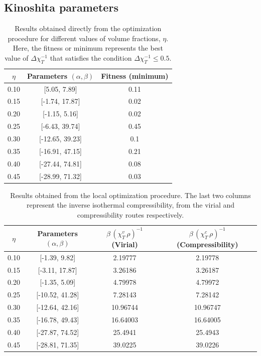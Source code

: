 \subsection{Kinoshita parameters}
\begin{table}
    \centering
    \begin{tabular}{|c|c|c|}
    \hline
    \(\eta\)  & Parameters \(\left(\alpha, \beta\right)\)  & Fitness (minimum)    \\ \hline
    0.10 & {[}5.05, 7.89{]}    & 0.11          \\ \hline
    0.15 & {[}-1.74, 17.87{]}   & 0.02          \\ \hline
    0.20 & {[}-1.15, 5.16{]}    & 0.02   \\ \hline
    0.25 & {[}-6.43, 39.74{]}   & 0.45  \\ \hline
    0.30 & {[}-12.65, 39.23{]} & 0.1  \\ \hline
    0.35 & {[}-16.91, 47.15{]}    & 0.21  \\ \hline
    0.40 & {[}-27.44, 74.81{]}  & 0.08  \\ \hline
    0.45 & {[}-28.99, 71.32{]}  & 0.03 \\ \hline
    \end{tabular}%
    \caption{Results obtained directly from the optimization procedure for different values of volume fractions, \(\eta\). Here, the fitness or minimum represents the best value of \(\Delta \chi^{-1}_{T}\) that satisfies the condition \(\Delta \chi^{-1}_{T} \leq 0.5\).}
    \label{tab:global-opt}
\end{table}

\begin{table}
    \centering
    \begin{tabular}{|c|c|c|c|}
    \hline
    \(\eta\)  & Parameters \(\left(\alpha, \beta\right)\) & \(\beta \, {\left(\chi^{v}_{T} \, \rho\right)}^{-1}\) (Virial)  & \(\beta \, {\left(\chi^{c}_{T} \, \rho\right)}^{-1}\) (Compressibility)  \\ \hline
    0.10 & [-1.39, 9.82]   & 2.19777  & 2.19778 \\ \hline
    0.15 & [-3.11, 17.87]  & 3.26186 & 3.26187  \\ \hline
    0.20 & [-1.35, 5.09]   & 4.79978  & 4.79972  \\ \hline
    0.25 & [-10.52, 41.28] & 7.28143  & 7.28142 \\ \hline
    0.30 & [-12.64, 42.16] & 10.96744 & 10.96747 \\ \hline
    0.35 & [-16.78, 49.43] & 16.64003 & 16.64005 \\ \hline
    0.40 & [-27.87, 74.52] & 25.4941 & 25.4943 \\ \hline
    0.45 & [-28.81, 71.35] & 39.0225  & 39.0226  \\ \hline
    \end{tabular}
    \caption{Results obtained from the local optimization procedure. The last two columns represent the inverse isothermal compressibility, from the virial and compressibility routes respectively.}
    \label{tab:local-opt}
\end{table}

